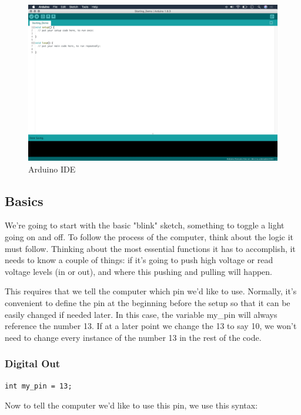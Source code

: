 \documentclass[a4paper]{article}
\begin{document}
\begin{figure}
\centering
\includegraphics[width=1\textwidth]{1-7.jpg}
\caption{\label{fig:arduino_ide}Arduino IDE}
\end{figure}

\subsection{Basics}
We're going to start with the basic "blink" sketch, something to toggle a light going on and off. To follow the process of the computer, think about the logic it must follow. Thinking about the most essential functions it has to accomplish, it needs to know a couple of things: if it's going to push high voltage or read voltage levels (in or out), and where this pushing and pulling will happen.

This requires that we tell the computer which pin we'd like to use. Normally, it's convenient to define the pin at the beginning before the setup so that it can be easily changed if needed later. In this case, the variable my\_pin will always reference the number 13. If at a later point we change the 13 to say 10, we won't need to change every instance of the number 13 in the rest of the code.

\subsubsection{Digital Out}

\begin{verbatim}
int my_pin = 13;
\end{verbatim}

Now to tell the computer we'd like to use this pin, we use this syntax:
\end{document}
